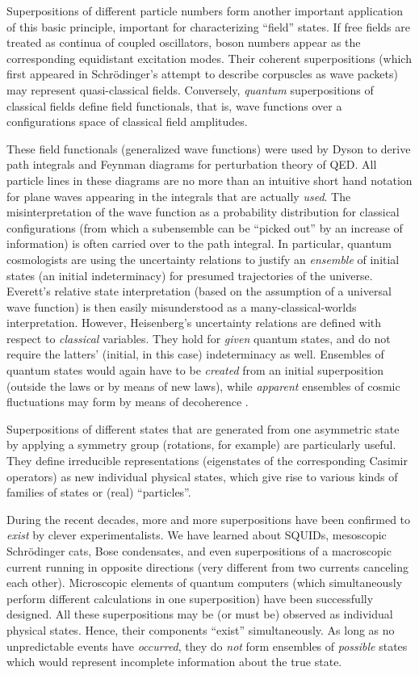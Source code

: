 Superpositions of different particle numbers form another important
application of this basic principle, important for characterizing
``field'' states. If free fields are treated as continua of coupled
oscillators, boson numbers appear as the corresponding equidistant
excitation modes. Their coherent superpositions (which first appeared
in Schr\"odinger's attempt to describe corpuscles as wave packets) may
represent quasi-classical fields. Conversely, {\it quantum}
superpositions of classical fields define field functionals, that is,
wave functions over a configurations space of classical field
amplitudes.

These field functionals (generalized wave functions) were used
by Dyson \cite{Dyson} to derive path integrals and Feynman
diagrams for perturbation theory of QED. All particle lines in these
diagrams are no more than an intuitive short hand notation for plane
waves appearing in the integrals that are actually {\it used}. The
misinterpretation of the wave function as a probability distribution
for classical configurations (from which a subensemble can be ``picked
out'' by an increase of information) is often carried over to the
path integral. In particular, quantum cosmologists are
using the uncertainty relations to justify an {\it ensemble}
of initial states (an initial indeterminacy) for presumed trajectories
of the universe. Everett's relative state interpretation (based on the
assumption of a universal wave function) is then easily
misunderstood as a many-classical-worlds interpretation. However,
Heisenberg's uncertainty relations are defined with respect to {\it
classical} variables. They hold for {\it given} quantum states, and
do not require the latters' (initial, in this case) indeterminacy as
well.  Ensembles of quantum states would again have to be {\it
created} from an initial superposition (outside the laws or by means
of new laws), while {\it apparent} ensembles of cosmic fluctuations may
form by means of decoherence
\cite{K+Polarski}.

Superpositions of different states that are
generated from one asymmetric state by applying a symmetry group
(rotations, for example) are particularly useful. They
define irreducible representations (eigenstates of the corresponding
Casimir operators) as new individual physical states, which give rise
to various kinds of families of states or (real)
``particles''.

During the recent decades, more and more superpositions have
been confirmed to {\it exist} by clever experimentalists. We
have learned about SQUIDs, mesoscopic Schr\"odinger cats, Bose
condensates, and even superpositions of a macroscopic current running
in opposite directions (very different from two currents canceling
each other). Microscopic elements of quantum computers (which
simultaneously perform different calculations in one superposition)
have been successfully designed. All these superpositions may be (or
must be) observed as individual physical states. Hence, their
components  ``exist'' simultaneously. As
long as no unpredictable events have {\it occurred}, they
do {\it not} form ensembles of {\it possible} states which would
represent incomplete information about the true state.

